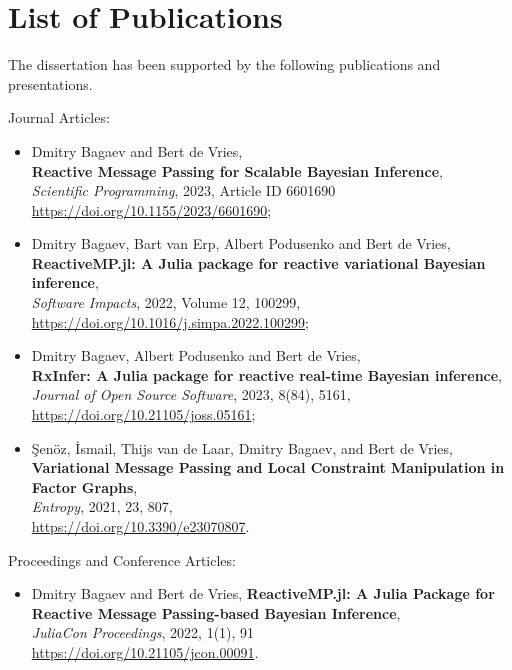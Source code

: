 \chapter{List of Publications}

The dissertation has been supported by the following publications and presentations.

Journal Articles:
\begin{itemize}
    \item Dmitry Bagaev and Bert de Vries,\\
          \textbf{Reactive Message Passing for Scalable Bayesian Inference},\\
          \textit{Scientific Programming}, 2023, Article ID 6601690\\
          \url{https://doi.org/10.1155/2023/6601690};
    \item Dmitry Bagaev, Bart van Erp, Albert Podusenko and Bert de Vries,\\
          \textbf{ReactiveMP.jl: A Julia package for reactive variational Bayesian inference},\\
          \textit{Software Impacts}, 2022, Volume 12, 100299,\\
          \url{https://doi.org/10.1016/j.simpa.2022.100299};
    \item Dmitry Bagaev, Albert Podusenko and Bert de Vries,\\
          \textbf{RxInfer: A Julia package for reactive real-time Bayesian inference},\\
          \textit{Journal of Open Source Software}, 2023, 8(84), 5161,\\
          \url{https://doi.org/10.21105/joss.05161};
    \item Şenöz, İsmail, Thijs van de Laar, Dmitry Bagaev, and Bert de Vries,\\
          \textbf{Variational Message Passing and Local Constraint Manipulation in Factor Graphs},\\
          \textit{Entropy}, 2021, 23, 807,\\
          \url{https://doi.org/10.3390/e23070807}.
\end{itemize}
Proceedings and Conference Articles:
\begin{itemize}
    \item Dmitry Bagaev and Bert de Vries,
          \textbf{ReactiveMP.jl: A Julia Package for Reactive Message Passing-based Bayesian Inference},\\
          \textit{JuliaCon Proceedings}, 2022, 1(1), 91\\
          \url{https://doi.org/10.21105/jcon.00091}.
\end{itemize}

